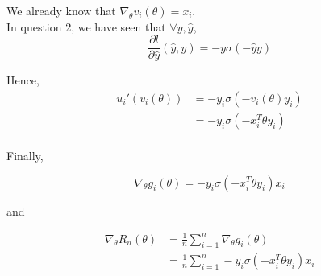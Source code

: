\documentclass[
10pt, %
a4paper, %
oneside, %
headinclude,footinclude, %
BCOR5mm, %
]{scrartcl}
\begin{document}
    We already know that $\nabla_{\theta}v_i(\theta) = x_i$.
    \\

	 In question 2, we have seen that $\forall y, \hat{y}$,
	    \begin{equation}
		\frac{\partial l}{\partial \hat{y}}( \hat{y}, y) = -y\sigma(-\hat{y}y)
	    \end{equation}

	    Hence,
	    \begin{equation}
		\begin{aligned}
		    u_i'(v_i(\theta))&= -y_i\sigma( -v_i(\theta)y_i)\\
		    &= -y_i\sigma( -x_i^T\theta y_i)\\
		\end{aligned}
	    \end{equation}

	Finally,

    \begin{equation}
	\nabla_{\theta}g_i(\theta) = -y_i\sigma( -x_i^T\theta y_i)x_i
    \end{equation}
    

    and 

    \begin{equation}
	\begin{aligned}
	    \label{eq:}
	    \nabla_{\theta}R_n(\theta) &= \frac{1}{n} \sum^{n}_{i=1}\nabla_{\theta}g_i(\theta) \\
        &= \frac{1}{n}  \sum^{n}_{i=1} -y_i\sigma(-x_i^T\theta y_i)x_i
	\end{aligned}
    \end{equation}
\end{document}
